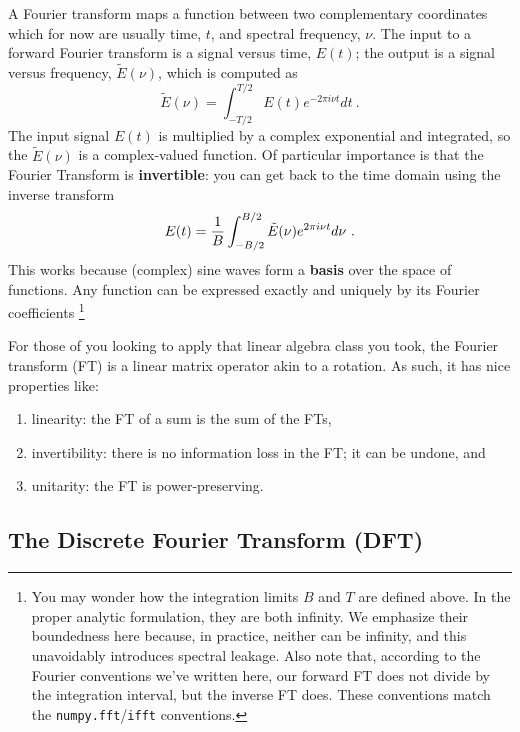 \documentclass[11pt,preprint]{aastex}
\begin{document}
\noindent
A Fourier transform maps a function between two complementary coordinates which
for now are usually time, $t$, and spectral frequency, $\nu$.
The input to a forward Fourier transform is a signal versus time, 
$E(t)$; the output is a signal versus frequency, $\tilde E(\nu)$,
which is computed as
% 
\begin{equation}
\tilde E(\nu) = \int_{-T/2}^{T/2} E(t) e^{-2 \pi i \nu t} dt \ .
\label{eq:dft}
\end{equation}
% 
\noindent The input signal $E(t)$ is multiplied by a complex
exponential and integrated, so the $\tilde E(\nu)$ is a complex-valued function. Of particular
importance is that the Fourier Transform is {\bf invertible}: 
you can get back to the time domain using the inverse transform
%
\begin{equation}
E(t) = {1 \over B} \int_{-B/2}^{B/2} \tilde E(\nu) e^{2 \pi i \nu t} d\nu \ .
\end{equation}
% 
This works because (complex) sine waves form a {\bf basis} over the space of functions.
Any function can be expressed exactly and uniquely by its Fourier coefficients
\footnote{You may wonder how
the integration limits $B$ and $T$ are defined above. In the proper
analytic formulation, they are both infinity. We emphasize their
boundedness here because, in practice, 
neither can be infinity, and this unavoidably introduces spectral leakage. Also note that,
according to the Fourier conventions we've written here, our forward FT does not divide
by the integration interval, but the inverse FT does.  These conventions match 
the {\tt numpy.fft}/{\tt ifft} conventions.}

For those of you looking to apply that linear algebra class you took,
the Fourier transform (FT) is a linear matrix operator akin to a rotation. 
As such, it has nice properties like:
\begin{enumerate}
\item linearity: the FT of a sum is the sum of the FTs, 
\item invertibility: there is no information loss in the FT; it can be undone, and 
\item unitarity: the FT is power-preserving.
\end{enumerate}


\subsection{The Discrete Fourier Transform (DFT)} \label{dft}
\end{document}
